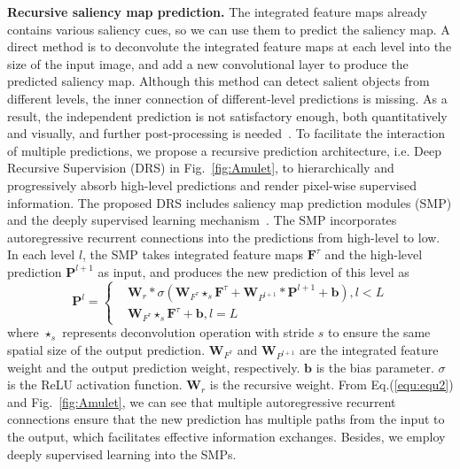 \documentclass[10pt,twocolumn,letterpaper]{article}
\begin{document}
\vspace{-5mm}
{\flushleft \textbf{Recursive saliency map prediction.}}
The integrated feature maps already contains various saliency cues, so we can use them to predict the saliency map.
A direct method is to deconvolute the integrated feature maps at each level into the size of the input image, and add a new convolutional layer to produce the predicted saliency map.
Although this method can detect salient objects from different levels, the inner connection of different-level predictions is missing.
As a result, the independent prediction is not satisfactory enough, both quantitatively and visually, and further
post-processing is needed~\cite{Li2016DeepSaliency,wang2016saliency}.
To facilitate the interaction of multiple predictions, we propose a recursive prediction architecture, i.e. Deep Recursive Supervision (DRS) in Fig.~\ref{fig:Amulet}, to hierarchically and progressively absorb high-level predictions and render pixel-wise supervised information.
The proposed DRS includes saliency map prediction modules (SMP) and the deeply supervised learning mechanism~\cite{xie2015holistically}.
The SMP incorporates autoregressive recurrent connections into the predictions from high-level to low.
In each level $l$, the SMP takes integrated feature maps $\textbf{F}^{\tau}$ and the high-level prediction $\textbf{P}^{l+1}$ as input, and produces the new prediction of this level as
\begin{equation}
  \label{equ:equ2}
\textbf{P}^{l}=
\left\{
\begin{aligned}
&\textbf{W}_{r}*\sigma(\textbf{W}_{F^{\tau}}\star_{s}\textbf{F}^{\tau}+\textbf{W}_{P^{l+1}}*\textbf{P}^{l+1}+\textbf{b}),l<L\\
&\textbf{W}_{F^{\tau}}\star_{s}\textbf{F}^{\tau}+\textbf{b}, l = L
\end{aligned}
\right.
\end{equation}
where $\star_{s}$ represents deconvolution operation with stride $s$ to ensure the same spatial size of the output prediction.
$\textbf{W}_{F^{\tau}}$ and $\textbf{W}_{P^{l+1}}$ are the integrated feature weight and the output prediction weight, respectively.
$\textbf{b}$ is the bias parameter.
$\sigma$ is the ReLU activation function.
$\textbf{W}_{r}$ is the recursive weight.
From Eq.(\ref{equ:equ2}) and Fig.~\ref{fig:Amulet}, we can see that multiple autoregressive recurrent connections
ensure that the new prediction has multiple paths from the input to the output, which facilitates effective information exchanges.
Besides, we employ deeply supervised learning into the SMPs.
\end{document}
